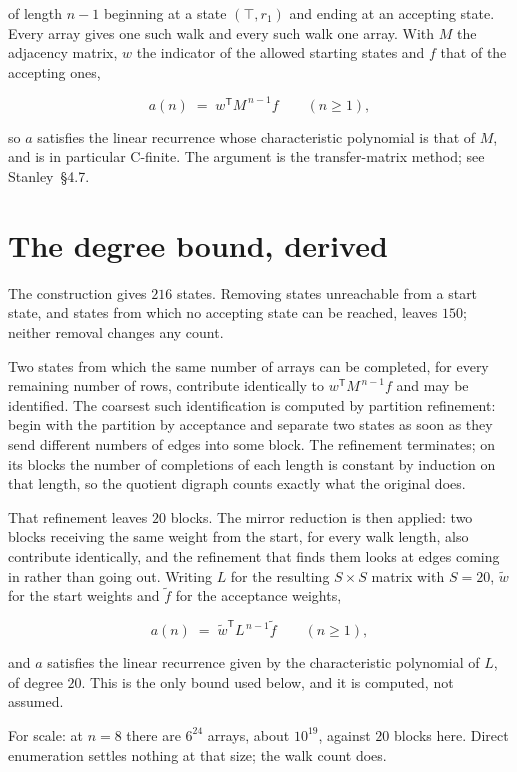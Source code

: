\documentclass[11pt]{article}
\theoremstyle{definition}
\begin{document}
of length $n-1$ beginning at a state $(\top,r_1)$ and ending at an accepting state. Every array gives one such walk and every such walk one array. With $M$ the adjacency matrix, $w$ the indicator of the allowed starting states and $f$ that of the accepting ones,

\[a(n) \;=\; w^{\mathsf T} M^{\,n-1} f \qquad (n \ge 1),\]

so $a$ satisfies the linear recurrence whose characteristic polynomial is that of $M$, and is in particular C-finite. The argument is the transfer-matrix method; see Stanley~\S4.7.

\section{The degree bound, derived}

The construction gives $216$ states. Removing states unreachable from a start state, and states from which no accepting state can be reached, leaves $150$; neither removal changes any count.

Two states from which the same number of arrays can be completed, for every remaining number of rows, contribute identically to $w^{\mathsf T}M^{\,n-1}f$ and may be identified. The coarsest such identification is computed by partition refinement: begin with the partition by acceptance and separate two states as soon as they send different numbers of edges into some block. The refinement terminates; on its blocks the number of completions of each length is constant by induction on that length, so the quotient digraph counts exactly what the original does.

That refinement leaves $20$ blocks. The mirror reduction is then applied: two blocks receiving the same weight from the start, for every walk length, also contribute identically, and the refinement that finds them looks at edges coming in rather than going out. Writing $L$ for the resulting $S \times S$ matrix with $S = 20$, $\tilde w$ for the start weights and $\tilde f$ for the acceptance weights,

\[a(n) \;=\; \tilde w^{\mathsf T} L^{\,n-1} \tilde f \qquad (n \ge 1),\]

and $a$ satisfies the linear recurrence given by the characteristic polynomial of $L$, of degree $20$. This is the only bound used below, and it is computed, not assumed.

For scale: at $n = 8$ there are $6^{24}$ arrays, about $10^{19}$, against $20$ blocks here. Direct enumeration settles nothing at that size; the walk count does.
\end{document}
